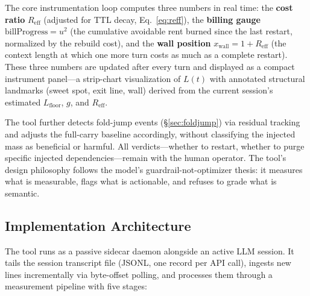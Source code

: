 \documentclass[11pt]{article}
\theoremstyle{definition}
\theoremstyle{remark}
\begin{document}
The core instrumentation loop computes three numbers in real time: the \textbf{cost ratio} $R_{\text{eff}}$ (adjusted for TTL decay, Eq.~\ref{eq:reff}), the \textbf{billing gauge} $\text{billProgress} = u^2$ (the cumulative avoidable rent burned since the last restart, normalized by the rebuild cost), and the \textbf{wall position} $x_{\text{wall}} = 1 + R_{\text{eff}}$ (the context length at which one more turn costs as much as a complete restart). These three numbers are updated after every turn and displayed as a compact instrument panel---a strip-chart visualization of $L(t)$ with annotated structural landmarks (sweet spot, exit line, wall) derived from the current session's estimated $L_{\text{floor}}$, $g$, and $R_{\text{eff}}$.

The tool further detects fold-jump events (\S\ref{sec:foldjump}) via residual tracking and adjusts the full-carry baseline accordingly, without classifying the injected mass as beneficial or harmful. All verdicts---whether to restart, whether to purge specific injected dependencies---remain with the human operator. The tool's design philosophy follows the model's guardrail-not-optimizer thesis: it measures what is measurable, flags what is actionable, and refuses to grade what is semantic.

\subsection{Implementation Architecture}

The tool runs as a passive sidecar daemon alongside an active LLM session. It tails the session transcript file (JSONL, one record per API call), ingests new lines incrementally via byte-offset polling, and processes them through a measurement pipeline with five stages:
\end{document}
